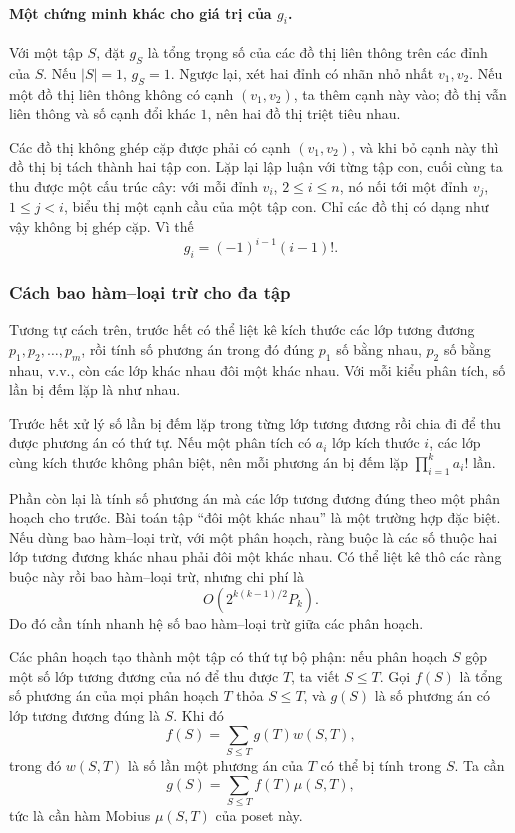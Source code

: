 \documentclass[11pt]{article}
\begin{document}
\paragraph{Một chứng minh khác cho giá trị của \(g_i\).}
Với một tập \(S\), đặt \(g_S\) là tổng trọng số của các đồ thị liên thông trên
các đỉnh của \(S\). Nếu \(\lvert S\rvert=1\), \(g_S=1\). Ngược lại, xét hai
đỉnh có nhãn nhỏ nhất \(v_1,v_2\). Nếu một đồ thị liên thông không có cạnh
\((v_1,v_2)\), ta thêm cạnh này vào; đồ thị vẫn liên thông và số cạnh đổi khác
\(1\), nên hai đồ thị triệt tiêu nhau.

Các đồ thị không ghép cặp được phải có cạnh \((v_1,v_2)\), và khi bỏ cạnh này
thì đồ thị bị tách thành hai tập con. Lặp lại lập luận với từng tập con, cuối
cùng ta thu được một cấu trúc cây: với mỗi đỉnh \(v_i\), \(2\le i\le n\), nó
nối tới một đỉnh \(v_j\), \(1\le j<i\), biểu thị một cạnh cầu của một tập con.
Chỉ các đồ thị có dạng như vậy không bị ghép cặp. Vì thế
\[
  g_i=(-1)^{i-1}(i-1)!.
\]

\subsubsection{Cách bao hàm--loại trừ cho đa tập}

Tương tự cách trên, trước hết có thể liệt kê kích thước các lớp tương đương
\(p_1,p_2,\ldots,p_m\), rồi tính số phương án trong đó đúng \(p_1\) số bằng
nhau, \(p_2\) số bằng nhau, v.v., còn các lớp khác nhau đôi một khác nhau. Với
mỗi kiểu phân tích, số lần bị đếm lặp là như nhau.

Trước hết xử lý số lần bị đếm lặp trong từng lớp tương đương rồi chia đi để
thu được phương án có thứ tự. Nếu một phân tích có \(a_i\) lớp kích thước
\(i\), các lớp cùng kích thước không phân biệt, nên mỗi phương án bị đếm lặp
\(\prod_{i=1}^{k}a_i!\) lần.

Phần còn lại là tính số phương án mà các lớp tương đương đúng theo một phân
hoạch cho trước. Bài toán tập ``đôi một khác nhau'' là một trường hợp đặc biệt.
Nếu dùng bao hàm--loại trừ, với một phân hoạch, ràng buộc là các số thuộc hai
lớp tương đương khác nhau phải đôi một khác nhau. Có thể liệt kê thô các ràng
buộc này rồi bao hàm--loại trừ, nhưng chi phí là
\[
  O\left(2^{k(k-1)/2}P_k\right).
\]
Do đó cần tính nhanh hệ số bao hàm--loại trừ giữa các phân hoạch.

Các phân hoạch tạo thành một tập có thứ tự bộ phận: nếu phân hoạch \(S\) gộp
một số lớp tương đương của nó để thu được \(T\), ta viết \(S\le T\). Gọi
\(f(S)\) là tổng số phương án của mọi phân hoạch \(T\) thỏa \(S\le T\), và
\(g(S)\) là số phương án có lớp tương đương đúng là \(S\). Khi đó
\[
  f(S)=\sum_{S\le T}g(T)w(S,T),
\]
trong đó \(w(S,T)\) là số lần một phương án của \(T\) có thể bị tính trong
\(S\). Ta cần
\[
  g(S)=\sum_{S\le T}f(T)\mu(S,T),
\]
tức là cần hàm Mobius \(\mu(S,T)\) của poset này.
\end{document}
